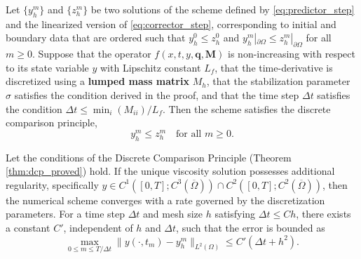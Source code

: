 \documentclass[10pt,a4paper]{amsart}
\begin{document}
\begin{thm}
\label{thm:dcp_proved}
Let $\{y_h^m\}$ and $\{z_h^m\}$ be two solutions of the scheme defined by \eqref{eq:predictor_step} and the linearized version of \eqref{eq:corrector_step}, corresponding to initial and boundary data that are ordered such that $y_h^0 \le z_h^0$ and $y_h^m|_{\partial\Omega} \le z_h^m|_{\partial\Omega}$ for all $m \ge 0$. Suppose that the operator $f(x, t, y, \bm{q}, \bm{M})$ is non-increasing with respect to its state variable $y$ with Lipschitz constant $L_f$, that the time-derivative is discretized using a \textbf{lumped mass matrix} $M_h$, that the stabilization parameter $\sigma$ satisfies the condition derived in the proof, and that the time step $\Delta t$ satisfies the condition $\Delta t \le \min_i (M_{ii}) / L_f$. Then the scheme satisfies the discrete comparison principle,
$$y_h^m \le z_h^m \quad \text{for all } m \ge 0.$$
\end{thm}

\begin{thm}
\label{thm:convergence_rate_narrative}
Let the conditions of the Discrete Comparison Principle (Theorem \ref{thm:dcp_proved}) hold. If the unique viscosity solution possesses additional regularity, specifically $y \in C^1([0,T]; C^3(\overline{\Omega})) \cap C^2([0,T]; C^2(\overline{\Omega}))$, then the numerical scheme converges with a rate governed by the discretization parameters. For a time step $\Delta t$ and mesh size $h$ satisfying $\Delta t \le Ch$, there exists a constant $C'$, independent of $h$ and $\Delta t$, such that the error is bounded as
\[
\max_{0 \le m \le T/\Delta t} \| y(\cdot, t_m) - y_h^m \|_{L^2(\Omega)} \leq C' (\Delta t + h^2).
\]
\end{thm}
\end{document}
